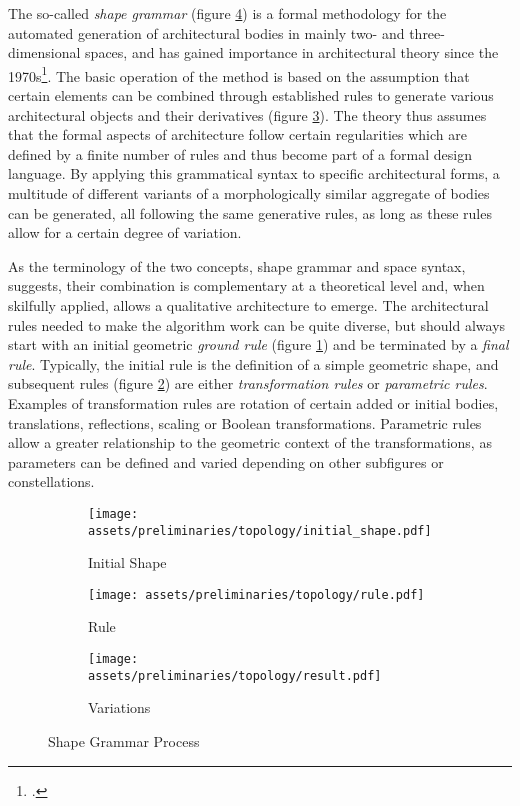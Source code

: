 \documentclass[a4paper, 12pt]{report}
\begin{document}
The so-called \textit{shape grammar} (figure \ref{fig:shape-grammar-process}) is a formal methodology for the automated generation of architectural bodies in mainly two- and three-dimensional spaces, and has gained importance in architectural theory since the 1970s\footcite{hong2022five}. The basic operation of the method is based on the assumption that certain elements can be combined through established rules to generate various architectural objects and their derivatives (figure \ref{fig:variations}). The theory thus assumes that the formal aspects of architecture follow certain regularities which are defined by a finite number of rules and thus become part of a formal design language. By applying this grammatical syntax to specific architectural forms, a multitude of different variants of a morphologically similar aggregate of bodies can be generated, all following the same generative rules, as long as these rules allow for a certain degree of variation.

As the terminology of the two concepts, shape grammar and space syntax, suggests, their combination is complementary at a theoretical level and, when skilfully applied, allows a qualitative architecture to emerge. The architectural rules needed to make the algorithm work can be quite diverse, but should always start with an initial geometric \textit{ground rule} (figure \ref{fig:initial-shape}) and be terminated by a \textit{final rule}. Typically, the initial rule is the definition of a simple geometric shape, and subsequent rules (figure \ref{fig:rule}) are either \textit{transformation rules} or \textit{parametric rules}. Examples of transformation rules are rotation of certain added or initial bodies, translations, reflections, scaling or Boolean transformations. Parametric rules allow a greater relationship to the geometric context of the transformations, as parameters can be defined and varied depending on other subfigures or constellations.

\begin{figure}
\centering
\begin{subfigure}{.2\textwidth}
\centering
\texttt{[image: assets/preliminaries/topology/initial\_shape.pdf]}
\caption{Initial Shape}
\label{fig:initial-shape}
\end{subfigure}%
\begin{subfigure}{.2\textwidth}
\centering
\texttt{[image: assets/preliminaries/topology/rule.pdf]}
\caption{Rule}
\label{fig:rule}
\end{subfigure}%
\begin{subfigure}{.6\textwidth}
\centering
\texttt{[image: assets/preliminaries/topology/result.pdf]}
\caption{Variations}
\label{fig:variations}
\end{subfigure}
\caption{Shape Grammar Process}
\label{fig:shape-grammar-process}
\end{figure}
\end{document}
